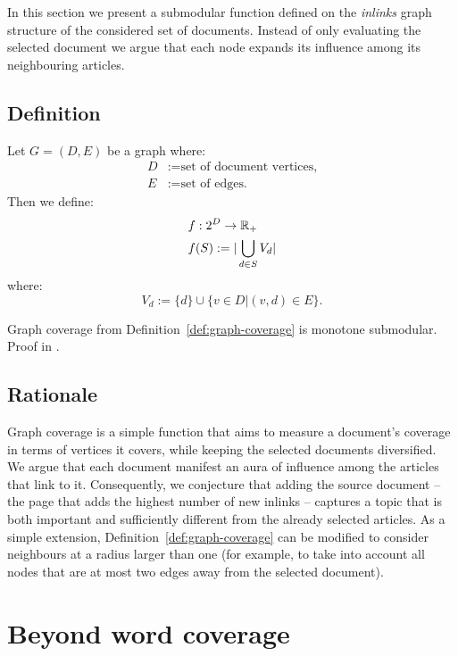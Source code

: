 In this section we present a submodular function defined on the \emph{inlinks}
graph structure of the considered set of documents. Instead of only evaluating
the selected document we argue that each node expands its influence among its
neighbouring articles.

\subsection{Definition}

\begin{definition}
  \label{def:graph-coverage}
  Let \(G = (D, E)\) be a graph where:
  \begin{align*}
    D &:= \text{set of document vertices,} \\
    E &:= \text{set of edges.}
  \end{align*}
  Then we define:
  \begin{align*}
    &f : 2^D \to \mathbb{R}_+ \\
    &f(S) := |\bigcup_{d \in S} V_d|
  \end{align*}
  where:
    \[V_d := \{d\} \cup \{v \in D | (v, d) \in E\} \text{.}\]
\end{definition}

\begin{proposition}
  \label{prop:graph-coverage}
  Graph coverage from Definition~\ref{def:graph-coverage} is monotone
  submodular. Proof in .
\end{proposition}

\subsection{Rationale}

Graph coverage is a simple function that aims to measure a document's coverage
in terms of vertices it covers, while keeping the selected documents
diversified.
We argue that each document manifest an aura of influence among the articles
that link to it.
Consequently, we conjecture that adding the source document -- the page
that adds the highest number of new inlinks -- captures a topic that is both
important and sufficiently different from the already selected articles.
As a simple extension, Definition~\vref{def:graph-coverage} can be modified to
consider neighbours at a radius larger than one (for example, to take into
account all nodes that are at most two edges away from the selected document).

\section{Beyond word coverage}
\label{sec:word-coverage++}

